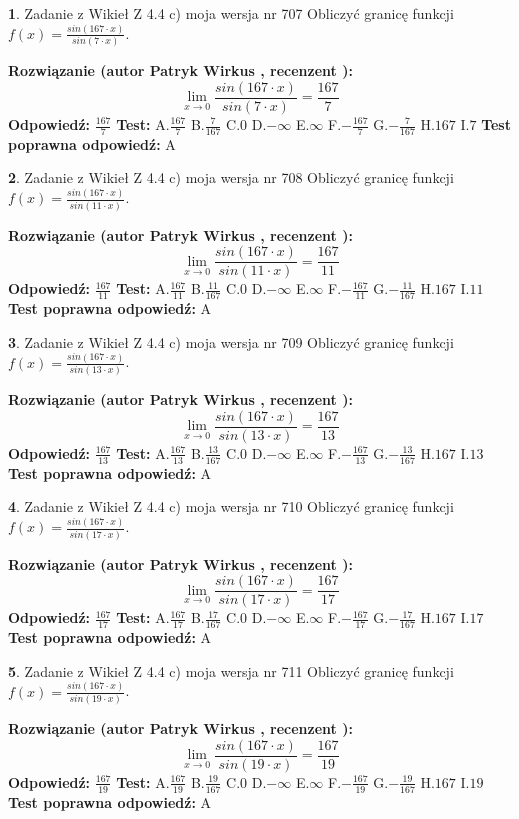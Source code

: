 \documentclass[12pt, a4paper]{article}
\theoremstyle{definition} %
\newtheorem{zad}{}
\newcommand{\zadStart}[1]{\begin{zad}#1\newline}
\newcommand{\zadStop}{\end{zad}}
\newcommand{\rozwStart}[2]{\noindent \textbf{Rozwiązanie (autor #1 , recenzent #2): }\newline}
\newcommand{\rozwStop}{\newline}
\newcommand{\odpStart}{\noindent \textbf{Odpowiedź:}\newline}
\newcommand{\odpStop}{\newline}
\newcommand{\testStart}{\noindent \textbf{Test:}\newline}
\newcommand{\testStop}{\newline}
\newcommand{\kluczStart}{\noindent \textbf{Test poprawna odpowiedź:}\newline}
\newcommand{\kluczStop}{\newline}
\begin{document}
\zadStart{Zadanie z Wikieł Z 4.4 c) moja wersja nr 707}
Obliczyć granicę funkcji $f(x)=\frac{sin(167\cdot x)}{sin(7\cdot x)}$.
\zadStop
\rozwStart{Patryk Wirkus}{}
$$\lim\limits_{x\to 0}\frac{sin(167\cdot x)}{sin(7\cdot x)}=
\frac{167}{7}$$
\rozwStop
\odpStart
$\frac{167}{7}$
\odpStop
\testStart
A.$\frac{167}{7}$
B.$\frac{7}{167}$
C.$0$
D.$-\infty$
E.$\infty$
F.$-\frac{167}{7}$
G.$-\frac{7}{167}$
H.$167$
I.$7$
\testStop
\kluczStart
A
\kluczStop



\zadStart{Zadanie z Wikieł Z 4.4 c) moja wersja nr 708}
Obliczyć granicę funkcji $f(x)=\frac{sin(167\cdot x)}{sin(11\cdot x)}$.
\zadStop
\rozwStart{Patryk Wirkus}{}
$$\lim\limits_{x\to 0}\frac{sin(167\cdot x)}{sin(11\cdot x)}=
\frac{167}{11}$$
\rozwStop
\odpStart
$\frac{167}{11}$
\odpStop
\testStart
A.$\frac{167}{11}$
B.$\frac{11}{167}$
C.$0$
D.$-\infty$
E.$\infty$
F.$-\frac{167}{11}$
G.$-\frac{11}{167}$
H.$167$
I.$11$
\testStop
\kluczStart
A
\kluczStop



\zadStart{Zadanie z Wikieł Z 4.4 c) moja wersja nr 709}
Obliczyć granicę funkcji $f(x)=\frac{sin(167\cdot x)}{sin(13\cdot x)}$.
\zadStop
\rozwStart{Patryk Wirkus}{}
$$\lim\limits_{x\to 0}\frac{sin(167\cdot x)}{sin(13\cdot x)}=
\frac{167}{13}$$
\rozwStop
\odpStart
$\frac{167}{13}$
\odpStop
\testStart
A.$\frac{167}{13}$
B.$\frac{13}{167}$
C.$0$
D.$-\infty$
E.$\infty$
F.$-\frac{167}{13}$
G.$-\frac{13}{167}$
H.$167$
I.$13$
\testStop
\kluczStart
A
\kluczStop



\zadStart{Zadanie z Wikieł Z 4.4 c) moja wersja nr 710}
Obliczyć granicę funkcji $f(x)=\frac{sin(167\cdot x)}{sin(17\cdot x)}$.
\zadStop
\rozwStart{Patryk Wirkus}{}
$$\lim\limits_{x\to 0}\frac{sin(167\cdot x)}{sin(17\cdot x)}=
\frac{167}{17}$$
\rozwStop
\odpStart
$\frac{167}{17}$
\odpStop
\testStart
A.$\frac{167}{17}$
B.$\frac{17}{167}$
C.$0$
D.$-\infty$
E.$\infty$
F.$-\frac{167}{17}$
G.$-\frac{17}{167}$
H.$167$
I.$17$
\testStop
\kluczStart
A
\kluczStop



\zadStart{Zadanie z Wikieł Z 4.4 c) moja wersja nr 711}
Obliczyć granicę funkcji $f(x)=\frac{sin(167\cdot x)}{sin(19\cdot x)}$.
\zadStop
\rozwStart{Patryk Wirkus}{}
$$\lim\limits_{x\to 0}\frac{sin(167\cdot x)}{sin(19\cdot x)}=
\frac{167}{19}$$
\rozwStop
\odpStart
$\frac{167}{19}$
\odpStop
\testStart
A.$\frac{167}{19}$
B.$\frac{19}{167}$
C.$0$
D.$-\infty$
E.$\infty$
F.$-\frac{167}{19}$
G.$-\frac{19}{167}$
H.$167$
I.$19$
\testStop
\kluczStart
A
\kluczStop
\end{document}
